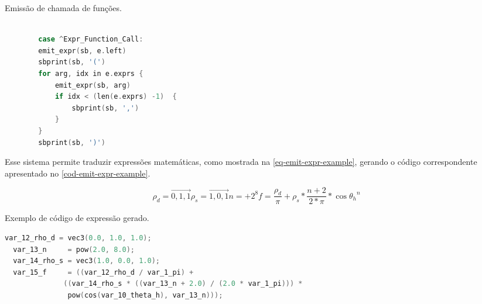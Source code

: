 \begin{codigo}[H]
    \caption{\small Emissão de chamada de funções. }
    \label{cod-emission-func}
\begin{lstlisting}[language=C, frame=none, inputencoding=utf8]

        case ^Expr_Function_Call:
        emit_expr(sb, e.left)
        sbprint(sb, '(')
        for arg, idx in e.exprs {
            emit_expr(sb, arg)
            if idx < (len(e.exprs) -1)  {
                sbprint(sb, ',')
            }
        }
        sbprint(sb, ')')
\end{lstlisting}
\end{codigo}


 Esse sistema permite traduzir expressões matemáticas, como mostrada na \autoref{eq-emit-expr-example}, gerando o código correspondente apresentado no \autoref{cod-emit-expr-example}.

\begin{subequations}
    \label{eq-emit-expr-example}
\begin{equation}
    \rho_{d} = \vec{0,1,1}
\end{equation}

\begin{equation}
    \rho_{s} = \vec{1,0,1}
\end{equation}

\begin{equation}
    n = +2^8
\end{equation}

\begin{equation}
f = \frac{\rho_{d}}{\pi} + \rho_{s} * \frac{n+2}{2*\pi} *
\cos{\theta_{h}}^{n}
\end{equation}
\end{subequations}

\begin{codigo}[H]
   \caption{\small Exemplo de código de expressão gerado. }
   \label{cod-emit-expr-example}
\begin{lstlisting}[language=C, frame=none, inputencoding=utf8]
  var_12_rho_d = vec3(0.0, 1.0, 1.0);
  var_13_n     = pow(2.0, 8.0);
  var_14_rho_s = vec3(1.0, 0.0, 1.0);
  var_15_f     = ((var_12_rho_d / var_1_pi) +
              ((var_14_rho_s * ((var_13_n + 2.0) / (2.0 * var_1_pi))) *
               pow(cos(var_10_theta_h), var_13_n)));
\end{lstlisting}
\end{codigo}

